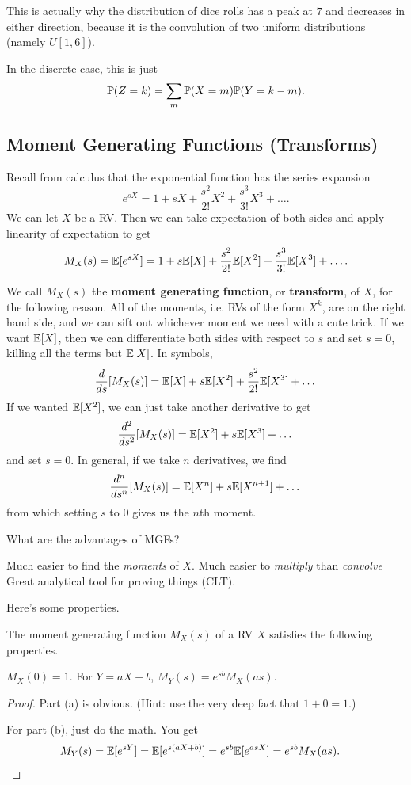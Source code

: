 \documentclass[11 pt]{scrartcl}
\begin{document}
This is actually why the distribution of dice rolls has a peak at $7$ and decreases in either direction, because it is the convolution of two uniform distributions (namely $U[1,6]$). 

In the discrete case, this is just 
\[ \mathbb P(Z=k) = \sum_m \mathbb P(X=m)\mathbb P(Y=k-m).\] 

\subsection{Moment Generating Functions (Transforms)}
Recall from calculus that the exponential function has the series expansion 
\[ e^{sX} = 1 + sX + \dfrac{s^2}{2!}X^2 + \dfrac{s^3}{3!}X^3 + \dots.\] 
We can let $X$ be a RV. Then we can take expectation of both sides and apply linearity of expectation to get 
\[ M_X(s) = \mathbb E[e^{sX}] = 1 + s\mathbb E[X] + \dfrac{s^2}{2!}\mathbb E[X^2] + \dfrac{s^3}{3!}\mathbb E[X^3] + \dots .\] 

We call $M_X(s)$ the \textbf{moment generating function}, or \textbf{transform}, of $X$, for the following reason. All of the moments, i.e. RVs of the form $X^k$, are on the right hand side, and we can sift out whichever moment we need with a cute trick. If we want $\mathbb E[X]$, then we can differentiate both sides with respect to $s$ and set $s = 0$, killing all the terms but $\mathbb E[X]$. In symbols, 
\[ \dfrac{d}{ds}[M_X(s)] = \mathbb E[X] + s\mathbb E[X^2] + \dfrac{s^2}{2!}\mathbb E[X^3] + \dots \] 
If we wanted $\mathbb E[X^2]$, we can just take another derivative to get 
\[ \dfrac{d^2}{ds^2}[M_X(s)] = \mathbb E[X^2] + s\mathbb E[X^3] + \dots\] 
and set $s = 0$. In general, if we take $n$ derivatives, we find 
\[ \dfrac{d^n}{ds^n}[M_X(s)] = \mathbb E[X^n] + s\mathbb E[X^{n+1}] + \dots \]
from which setting $s$ to $0$ gives us the $n$th moment. 

What are the advantages of MGFs? 
\begin{enumerate}
    \ii Much easier to find the \emph{moments} of $X$. 
    \ii Much easier to \emph{multiply} than \emph{convolve}
    \ii Great analytical tool for proving things (CLT).
\end{enumerate}

Here's some properties. 
\begin{theorem}
    The moment generating function $M_X(s)$ of a RV $X$ satisfies the following properties. 
    \begin{enumerate}[(1)]
        \ii $M_X(0) = 1$. 
        \ii For $Y = aX + b$, $M_Y(s) = e^{sb}M_X(as)$.
    \end{enumerate}
\end{theorem}
\begin{proof}
    Part (a) is obvious. (Hint: use the very deep fact that $1 + 0 = 1$.)

    For part (b), just do the math. You get 
    \begin{align*}
        M_Y(s) &= \mathbb E[e^{sY}] 
               = \mathbb E[e^{s(aX+b)}] 
               = e^{sb}\mathbb E[e^{asX}] = e^{sb} M_X(as).
    \end{align*}
\end{proof}
\end{document}
